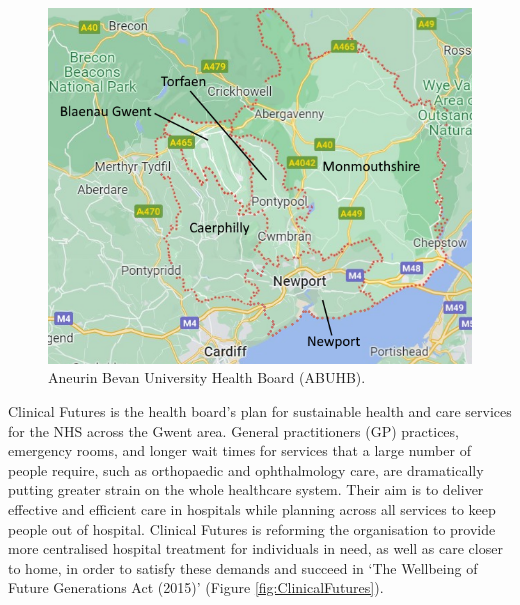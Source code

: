 \documentclass[../thesis.tex]{subfiles}
\begin{document}
\begin{figure}[h!]
    \centering
    \includegraphics[scale=0.5]{Chapters/Chapter1/Figures/Updated_ABUHB.png}
    \caption{Aneurin Bevan University Health Board (ABUHB).}
    \label{fig:AbuhbCounties}
\end{figure}

Clinical Futures is the health board's plan for sustainable health and care services for the NHS across the Gwent area. General practitioners (GP) practices, emergency rooms, and longer wait times for services that a large number of people require, such as orthopaedic and ophthalmology care, are dramatically putting greater strain on the whole healthcare system. Their aim is to deliver effective and efficient care in hospitals while planning across all services to keep people out of hospital. Clinical Futures is reforming the organisation to provide more centralised hospital treatment for individuals in need, as well as care closer to home, in order to satisfy these demands and succeed in `The Wellbeing of Future Generations Act (2015)' \cite{WelshGovernment} (Figure \ref{fig:ClinicalFutures}).
\end{document}
